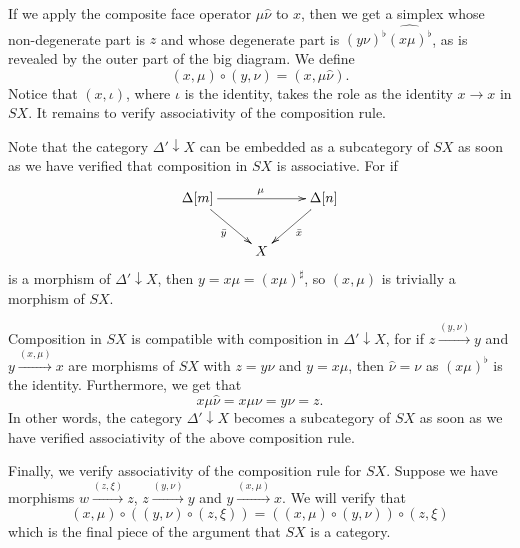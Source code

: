 If we apply the composite face operator $\mu \hat{\nu }$ to $x$, then we get a simplex whose non-degenerate part is $z$ and whose degenerate part is $(y\nu )^\flat \widehat{(x\mu )^\flat }$, as is revealed by the outer part of the big diagram. We define
\[(x,\mu )\circ (y,\nu )=(x,\mu \hat{\nu } ).\]
Notice that $(x,\iota )$, where $\iota$ is the identity, takes the role as the identity $x\to x$ in $SX$. It remains to verify associativity of the composition rule.

Note that the category $\Delta '\downarrow X$ can be embedded as a subcategory of $SX$ as soon as we have verified that composition in $SX$ is associative. For if
\begin{displaymath}
\xymatrix{
\Delta [m] \ar[dr]_{\bar{y} } \ar[rr]^\mu && \Delta [n] \ar[ld]^{\bar{x} } \\
& X
}
\end{displaymath}
is a morphism of $\Delta '\downarrow X$, then $y=x\mu =(x\mu )^\sharp$, so $(x,\mu )$ is trivially a morphism of $SX$.

Composition in $SX$ is compatible with composition in $\Delta '\downarrow X$, for if $z\xrightarrow{(y,\nu )} y$ and $y\xrightarrow{(x,\mu )} x$ are morphisms of $SX$ with $z=y\nu$ and $y=x\mu$, then $\hat{\nu } =\nu$ as $(x\mu )^\flat$ is the identity. Furthermore, we get that
\[x\mu \hat{\nu } =x\mu \nu =y\nu =z.\]
In other words, the category $\Delta '\downarrow X$ becomes a subcategory of $SX$ as soon as we have verified associativity of the above composition rule.

Finally, we verify associativity of the composition rule for $SX$. Suppose we have morphisms $w\xrightarrow{(z,\xi )} z$, $z\xrightarrow{(y,\nu )} y$ and $y\xrightarrow{(x,\mu )} x$. We will verify that
\begin{equation}\label{eq:simplex_category_verification_associativity}
(x,\mu )\circ ((y,\nu )\circ (z,\xi ))=((x,\mu )\circ (y,\nu ))\circ (z,\xi )
\end{equation}
which is the final piece of the argument that $SX$ is a category.

